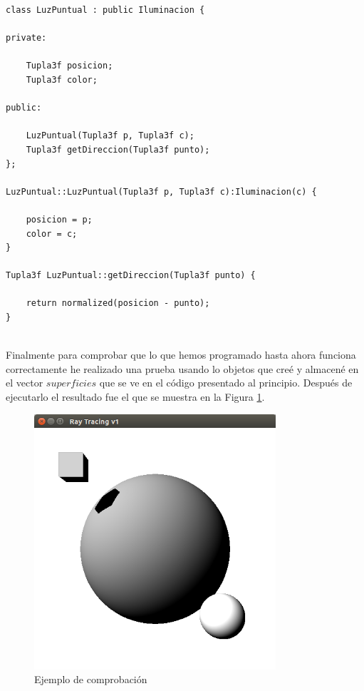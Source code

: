 \begin{lstlisting}[style=Consola]
class LuzPuntual : public Iluminacion {

private:

	Tupla3f posicion;
	Tupla3f color;

public:

	LuzPuntual(Tupla3f p, Tupla3f c);
	Tupla3f getDireccion(Tupla3f punto);
};

LuzPuntual::LuzPuntual(Tupla3f p, Tupla3f c):Iluminacion(c) {

	posicion = p;
	color = c;
}

Tupla3f LuzPuntual::getDireccion(Tupla3f punto) {

	return normalized(posicion - punto);
}
\end{lstlisting}
${ }$\\


Finalmente para comprobar que lo que hemos programado hasta ahora funciona correctamente he realizado una prueba usando lo objetos que creé y almacené en el vector $superficies$ que se ve en el código presentado al principio. Después de ejecutarlo el resultado fue el que se muestra en la Figura \ref{fig:etiq_9}.
${ }$\\

\begin{figure}[h]
	\begin{center}
		\includegraphics[width=0.8\textwidth]{imagenes/prueba.png}
	\end{center}
	\caption{Ejemplo de comprobación}
	\label{fig:etiq_9}
\end{figure}

